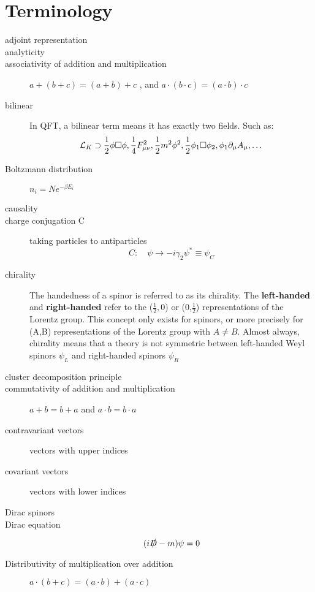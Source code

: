\chapter{Terminology}
\begin{description}
    \item [adjoint representation]
    \item [analyticity]
    \item [associativity of addition and multiplication]    
	$a+(b+c) = (a+b)+c$   , and $a\cdot(b\cdot c)=(a\cdot b)\cdot c$
    \item [bilinear]	In QFT, a bilinear term means it has exactly two
	fields. Such as:
	\[ \mathcal{L}_K \supset \frac{1}{2}\phi\Box\phi,
	\frac{1}{4}F^2_{\mu\nu}, \frac{1}{2}m^2\phi^2,
	\frac{1}{2}\phi_1\Box\phi_2, \phi_1\partial_\mu A_\mu, \dots \]

    \item [Boltzmann distribution]  $n_{i} = Ne^{-\beta E_{i}}$

    \item [causality]
    \item [charge conjugation C] taking particles to antiparticles
	\[
	    C:\quad\psi\rightarrow-i\gamma_2\psi^*\equiv\psi_C
	\]
    \item [chirality] The handedness of a spinor is referred to as its
	chirality. The \textbf{left-handed} and \textbf{right-handed} 
	refer to the ($\frac{1}{2},0$) or (0,$\frac{1}{2}$) representations
	of the Lorentz group. This concept only exists for spinors, or more
	precisely for (A,B) representations of the Lorentz group with
	$A\neq B$. Almost always, chirality means that a theory is not
	symmetric between left-handed Weyl spinors $\psi_L$ and right-handed
	spinors $\psi_R$
    \item [cluster decomposition principle]
    \item [commutativity of addition and multiplication] 
	$a+b=b+a$ and $a\cdot b = b\cdot a$
    \item [contravariant vectors]   vectors with upper indices
    \item [covariant vectors]	vectors with lower indices

    \item [Dirac spinors]
    \item [Dirac equation]
	\[
	    (i\slashed{D} -m)\psi =0
	\]
    \item [Distributivity of multiplication over addition]
	$a\cdot(b+c)=(a\cdot b) + (a\cdot c)$


\end{description}
